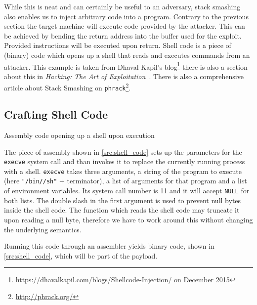 \documentclass[article]{uibk}
\begin{document}
While this is neat and can certainly be useful to an adversary, stack smashing
also enables us to inject arbitrary code into a program. Contrary to the
previous section the target machine will execute code provided by the attacker.
This can be achieved by bending the return address into the buffer used for the
exploit. Provided instructions will be executed upon return. Shell code is a
piece of (binary) code which opens up a shell that reads and executes commands
from an attacker. This example is taken from Dhaval Kapil's
blog\footnote{\url{https://dhavalkapil.com/blogs/Shellcode-Injection/} on
December 2015} there is also a section about this in \textit{Hacking: The Art
of Exploitation}~\cite[pp.~281]{art_of_exploitation}. There is also a
comprehensive article \cite{phrack_stack_smash} about Stack Smashing on
\texttt{phrack}\footnote{\url{http://phrack.org/}}.

\subsection{Crafting Shell Code}

\begin{listing}[h!]
    \begin{minipage}[t]{0.4\textwidth}
    \end{minipage}\hfill
    \begin{minipage}[t]{0.5\textwidth}
    \end{minipage}
    \caption{Assembly code opening up a shell upon execution}
    \label{src:shell_code}
\end{listing}

The piece of assembly shown in \cref{src:shell_code} sets up the parameters for
the \texttt{execve} system call and than invokes it to replace the currently
running process with a shell. \texttt{execve} takes three arguments, a string
of the program to execute (here \texttt{"/bin//sh"} + terminator), a list of
arguments for that program and a list of environment variables. Its system call
number is 11 and it will accept \texttt{NULL} for both lists. The double slash
in the first argument is used to prevent null bytes inside the shell code. The
function which reads the shell code may truncate it upon reading a null byte,
therefore we have to work around this without changing the underlying
semantics.

Running this code through an assembler yields binary code, shown in
\cref{src:shell_code}, which will be part of the payload.
\end{document}
